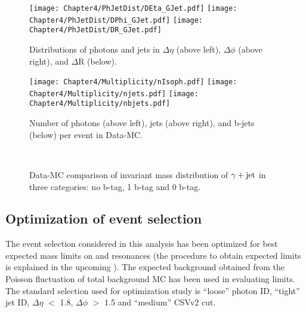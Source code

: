 \begin{figure}[htbp]
\centering
\texttt{[image: Chapter4/PhJetDist/DEta\_GJet.pdf]} \hspace{0.2in}
\texttt{[image: Chapter4/PhJetDist/DPhi\_GJet.pdf]}
\texttt{[image: Chapter4/PhJetDist/DR\_GJet.pdf]}
\caption{Distributions of photons and jets in $\Delta\eta$ (above left), $\Delta\phi$ (above right), and $\Delta$R (below).}
\label{fig:deta}
\end{figure}
\vspace{-0.3in}
\begin{figure}[htbp]
\centering
\texttt{[image: Chapter4/Multiplicity/nIsoph.pdf]} \hspace{0.2in}
\texttt{[image: Chapter4/Multiplicity/njets.pdf]}
\texttt{[image: Chapter4/Multiplicity/nbjets.pdf]}
\caption{Number of photons (above left), jets (above right), and b-jets (below) per event in Data-MC.}
\label{fig:mult}
\end{figure}


\begin{figure}[htbp]
\centering
{}\\ \vspace{0.4in}
\caption{Data-MC comparison of invariant mass distribution of $\gamma+\mathrm{jet}$ in three categories: no b-tag, 1 b-tag and 0 b-tag.}
\label{fig:InvtMass_DataMC}
\end{figure}


\subsection{Optimization of event selection}
The event selection considered in this analysis has been optimized for best expected mass limits on \qstar and \bstar resonances
(the procedure to obtain expected limits is explained in the upcoming
\sectn{\ref{Se:Limits}}). The expected background obtained from the Poisson fluctuation of total background MC has been used in evaluating limits. The
standard selection used for optimization study is ``loose'' photon ID, ``tight'' jet ID, $\Delta\eta$ $<$ 1.8, $\Delta\phi$ $>$ 1.5 and ``medium'' CSVv2 cut.


